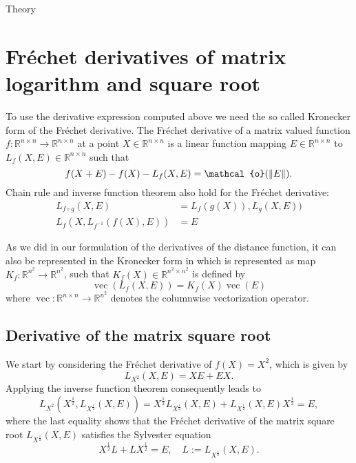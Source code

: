 \begin{chapter}{Theory}




\section{Fr\'{e}chet derivatives of matrix logarithm and square root} %
\label{sec:frechetderivatives}
To use the derivative expression computed above we need the so called Kronecker form of the Fr\'{e}chet derivative. The Fr\'{e}chet derivative
of a matrix valued function $f:\mathbb{R}^{n\times n}\to\mathbb{R}^{n\times n}$ at a point $X\in\mathbb{R}^{n\times n}$ is a linear function mapping $E\in\mathbb{R}^{n\times n}$
to $L_f(X,E)\in \mathbb{R}^{n\times n}$ such that
\begin{equation}
    f(X+E) - f(X) - L_f(X,E) = \mathcal{o}(\norm{E}).
\end{equation}
Chain rule and inverse function theorem also hold for the Fr\'{e}chet derivative:
\begin{align}
    L_{f\circ g}(X, E) &= L_{f}(g(X)),L_{g}(X,E))\\
    L_{f}(X, L_{f^{-1}}(f(X),E)) &= E
\end{align}

As we did in our formulation of the derivatives of the distance function, it can also be represented in the Kronecker form in which is represented as map
$K_f:\mathbb{R}^{n^2}\to\mathbb{R}^{n^2}$, such that $K_f(X)\in \mathbb{R}^{n^2\times n^2}$ is defined by
\begin{equation}
    \label{eq:kronckerform}
    \operatorname{vec}(L_f(X,E))=K_f(X)\operatorname{vec}(E)
\end{equation}
where $\operatorname{vec}:\mathbb{R}^{n\times n}\to\mathbb{R}^{n^2}$ denotes the columnwise vectorization operator.

\subsection{Derivative of the matrix square root} %
\label{sub:Derivative of the matrix square root}
We start by considering the Fr\'{e}chet derivative of $f(X)=X^2$, which is given by
\begin{equation}
    L_{X^2}(X,E) = XE + EX.
\end{equation}
Applying the inverse function theorem consequently leads to
\begin{equation}
    L_{X^2}(X^{\frac{1}{2}},L_{X^{\frac{1}{2}}}(X,E))=X^{\frac{1}{2}}L_{X^{\frac{1}{2}}}(X,E) + L_{X^{\frac{1}{2}}}(X,E)X^{\frac{1}{2}} = E,
\end{equation}
where the last equality shows that the Fr\'{e}chet derivative of the matrix square root $L_{X^{\frac{1}{2}}}(X,E)$ satisfies the Sylvester equation 
\begin{equation}
    \label{eq:sylvester}
    X^{\frac{1}{2}}L + LX^{\frac{1}{2}} = E,\quad L:=L_{X^{\frac{1}{2}}}(X,E).
\end{equation}


\end{chapter}
